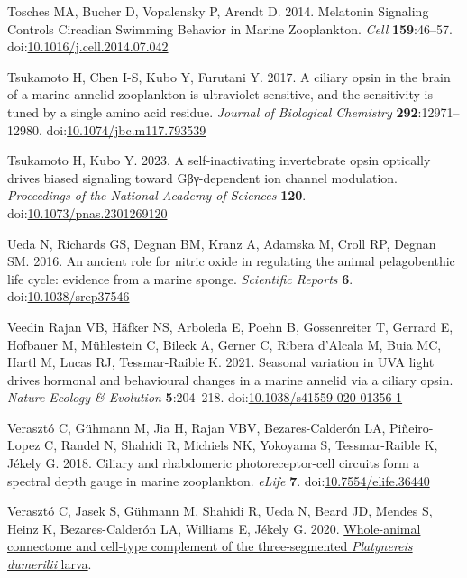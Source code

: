 \documentclass[
  10pt,
  onecolumn]{article}
\newlength{\cslhangindent}
\newlength{\cslentryspacingunit} %
\newenvironment{CSLReferences}[2] %
 {%
  \setlength{\parindent}{0pt}
  \ifodd #1
  \let\oldpar\par
  \def\par{\hangindent=\cslhangindent\oldpar}
  \fi
  \setlength{\parskip}{#2\cslentryspacingunit}
 }%
 {}
\begin{document}
\begin{CSLReferences}{1}{0}
\leavevmode{}%
Tosches MA, Bucher D, Vopalensky P, Arendt D. 2014. Melatonin Signaling
Controls Circadian Swimming Behavior in Marine Zooplankton. \emph{Cell}
\textbf{159}:46--57.
doi:\href{https://doi.org/10.1016/j.cell.2014.07.042}{10.1016/j.cell.2014.07.042}

\leavevmode{}%
Tsukamoto H, Chen I-S, Kubo Y, Furutani Y. 2017. A ciliary opsin in the
brain of a marine annelid zooplankton is ultraviolet-sensitive, and the
sensitivity is tuned by a single amino acid residue. \emph{Journal of
Biological Chemistry} \textbf{292}:12971--12980.
doi:\href{https://doi.org/10.1074/jbc.m117.793539}{10.1074/jbc.m117.793539}

\leavevmode{}%
Tsukamoto H, Kubo Y. 2023. A self-inactivating invertebrate opsin
optically drives biased signaling toward Gβγ-dependent ion channel
modulation. \emph{Proceedings of the National Academy of Sciences}
\textbf{120}.
doi:\href{https://doi.org/10.1073/pnas.2301269120}{10.1073/pnas.2301269120}

\leavevmode{}%
Ueda N, Richards GS, Degnan BM, Kranz A, Adamska M, Croll RP, Degnan SM.
2016. An ancient role for nitric oxide in regulating the animal
pelagobenthic life cycle: evidence from a marine sponge.
\emph{Scientific Reports} \textbf{6}.
doi:\href{https://doi.org/10.1038/srep37546}{10.1038/srep37546}

\leavevmode{}%
Veedin Rajan VB, Häfker NS, Arboleda E, Poehn B, Gossenreiter T, Gerrard
E, Hofbauer M, Mühlestein C, Bileck A, Gerner C, Ribera d'Alcala M, Buia
MC, Hartl M, Lucas RJ, Tessmar-Raible K. 2021. Seasonal variation in UVA
light drives hormonal and behavioural changes in a marine annelid via a
ciliary opsin. \emph{Nature Ecology \& Evolution} \textbf{5}:204--218.
doi:\href{https://doi.org/10.1038/s41559-020-01356-1}{10.1038/s41559-020-01356-1}

\leavevmode{}%
Verasztó C, Gühmann M, Jia H, Rajan VBV, Bezares-Calderón LA,
Piñeiro-Lopez C, Randel N, Shahidi R, Michiels NK, Yokoyama S,
Tessmar-Raible K, Jékely G. 2018. Ciliary and rhabdomeric
photoreceptor-cell circuits form a spectral depth gauge in marine
zooplankton. \emph{eLife} \textbf{7}.
doi:\href{https://doi.org/10.7554/elife.36440}{10.7554/elife.36440}

\leavevmode{}%
Verasztó C, Jasek S, Gühmann M, Shahidi R, Ueda N, Beard JD, Mendes S,
Heinz K, Bezares-Calderón LA, Williams E, Jékely G. 2020.
\href{http://dx.doi.org/10.1101/2020.08.21.260984}{Whole-animal
connectome and cell-type complement of the three-segmented
{\emph{Platynereis dumerilii}} larva}.


\end{CSLReferences}
\end{document}
